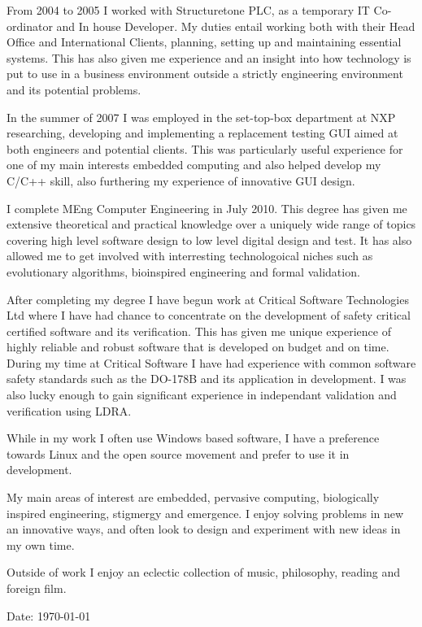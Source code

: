 \documentclass[overlapped,line,letterpaper]{res}
\begin{document}
\begin{resume}
From 2004 to 2005 I worked with Structuretone PLC, as a temporary IT
Co-ordinator and In house Developer.
My duties entail working both with their Head Office and International Clients,
planning, setting up and maintaining essential systems.
This has also given me experience and an insight into how technology is put to
use in a business environment outside a strictly engineering environment and its
potential problems.

In the summer of 2007 I was employed in the set-top-box department at NXP
researching, developing and implementing a replacement testing GUI aimed at both
engineers and potential clients.
This was particularly useful experience for one of my main interests embedded
computing and also helped develop my C/C++ skill, also furthering my experience
of innovative GUI design.

I complete MEng Computer Engineering in July 2010.
This degree has given me extensive theoretical and practical knowledge over a
uniquely wide range of topics covering high level software design to low level
digital design and test.
It has also allowed me to get involved with interresting technologoical niches
such as evolutionary algorithms, bioinspired engineering and formal validation.

After completing my degree I have begun work at Critical Software Technologies
Ltd where I have had chance to concentrate on the development of safety critical
certified software and its verification.
This has given me unique experience of highly reliable and robust software that
is developed on budget and on time.
During my time at Critical Software I have had experience with common software
safety standards such as the DO-178B and its application in development.
I was also lucky enough to gain significant experience in independant validation
and verification using LDRA.

While in my work I often use Windows based software, I have a preference towards
Linux and the open source movement and prefer to use it in development.

My main areas of interest are embedded, pervasive computing, biologically
inspired engineering, stigmergy and emergence.
I enjoy solving problems in new an innovative ways, and often look to design and
experiment with new ideas in my own time.

Outside of work I enjoy an eclectic collection of music, philosophy, reading and
foreign film.


\begin{center}
{\tiny \rm $ $Date: \today $ $ }
\end{center}

\end{resume}
\end{document}

